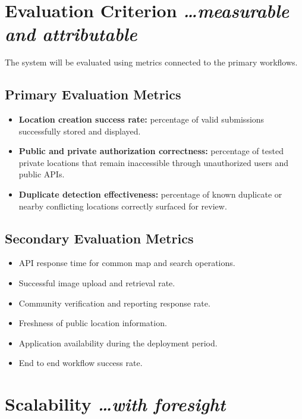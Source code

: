 \documentclass[11pt,a4paper]{article}
\newcommand{\BvrHint}[1]{%
  {\normalfont\normalsize\itshape\hfill #1}}
\begin{document}
\section{Evaluation Criterion%
  \BvrHint{\ldots measurable and attributable}}

The system will be evaluated using metrics connected to the primary workflows.

\subsection{Primary Evaluation Metrics}

\begin{itemize}[leftmargin=0.7cm]
    \item \textbf{Location creation success rate:} percentage of valid
    submissions successfully stored and displayed.
    
    \item \textbf{Public and private authorization correctness:} percentage
    of tested private locations that remain inaccessible through unauthorized
    users and public APIs.
    
    \item \textbf{Duplicate detection effectiveness:} percentage of known
    duplicate or nearby conflicting locations correctly surfaced for review.
\end{itemize}

\subsection{Secondary Evaluation Metrics}

\begin{itemize}[leftmargin=0.7cm]
    \item API response time for common map and search operations.
    \item Successful image upload and retrieval rate.
    \item Community verification and reporting response rate.
    \item Freshness of public location information.
    \item Application availability during the deployment period.
    \item End to end workflow success rate.
\end{itemize}

\section{Scalability%
  \BvrHint{\ldots with foresight}}
\end{document}
